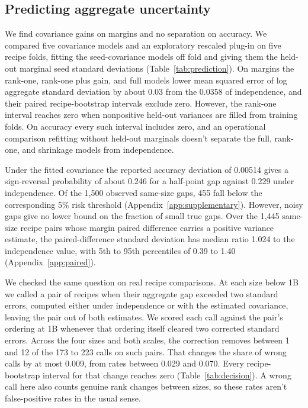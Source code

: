 \documentclass{article}
\begin{document}
\subsection{Predicting aggregate uncertainty}
\label{sec:prediction}
We find covariance gains on margins and no separation on accuracy. We compared five covariance models and an exploratory rescaled plug-in on five recipe folds, fitting the seed-covariance models off fold and giving them the held-out marginal seed standard deviations (Table~\ref{tab:prediction}). On margins the rank-one, rank-one plus gain, and full models lower mean squared error of log aggregate standard deviation by about 0.03 from the 0.0358 of independence, and their paired recipe-bootstrap intervals exclude zero. However, the rank-one interval reaches zero when nonpositive held-out variances are filled from training folds. On accuracy every such interval includes zero, and an operational comparison refitting without held-out marginals doesn't separate the full, rank-one, and shrinkage models from independence.

Under the fitted covariance the reported accuracy deviation of 0.00514 gives a sign-reversal probability of about 0.246 for a half-point gap against 0.229 under independence. Of the 1,500 observed same-size gaps, 455 fall below the corresponding 5\% risk threshold (Appendix~\ref{app:supplementary}). However, noisy gaps give no lower bound on the fraction of small true gaps. Over the 1,445 same-size recipe pairs whose margin paired difference carries a positive variance estimate, the paired-difference standard deviation has median ratio 1.024 to the independence value, with 5th to 95th percentiles of 0.39 to 1.40 (Appendix~\ref{app:paired}).

We checked the same question on real recipe comparisons. At each size below 1B we called a pair of recipes when their aggregate gap exceeded two standard errors, computed either under independence or with the estimated covariance, leaving the pair out of both estimates. We scored each call against the pair's ordering at 1B whenever that ordering itself cleared two corrected standard errors. Across the four sizes and both scales, the correction removes between 1 and 12 of the 173 to 223 calls on such pairs. That changes the share of wrong calls by at most 0.009, from rates between 0.029 and 0.070. Every recipe-bootstrap interval for that change reaches zero (Table~\ref{tab:decision}). A wrong call here also counts genuine rank changes between sizes, so these rates aren't false-positive rates in the usual sense.
\end{document}
